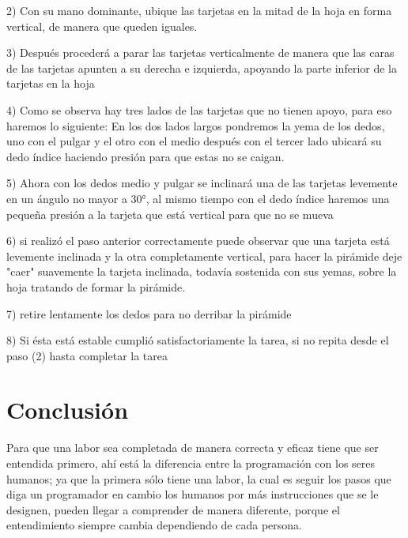 \documentclass{article}
\begin{document}
\vspace{10PT}

2) Con su mano dominante, ubique las tarjetas en la mitad de la hoja en forma vertical, de manera que queden iguales.

\vspace{10PT}

3) Después procederá a parar las tarjetas verticalmente de manera que las caras de las tarjetas apunten a su derecha e izquierda, apoyando la parte inferior de la tarjetas en la hoja 

\vspace{10PT}

4) Como se observa hay tres lados de las tarjetas que no tienen apoyo, para eso haremos lo siguiente: En los dos lados largos pondremos la yema de los dedos, uno con el pulgar y el otro con el medio después con el tercer lado ubicará su dedo índice haciendo presión para que estas no se caigan.
\vspace{10PT}

5) Ahora con los dedos medio y pulgar se inclinará una de las tarjetas levemente en un ángulo no mayor a 30°, al mismo tiempo con el dedo índice haremos una pequeña presión a la tarjeta que está vertical para que no se mueva

\vspace{10PT}

6) si realizó el paso anterior correctamente puede observar que una tarjeta está levemente inclinada y la otra completamente vertical, para hacer la pirámide deje "caer" suavemente la tarjeta inclinada, todavía sostenida con sus yemas, sobre la hoja tratando de formar la pirámide.

\vspace{10PT}

7) retire lentamente los dedos para no derribar la pirámide 

\vspace{10PT}

8) Si ésta está estable cumplió satisfactoriamente la tarea, si no repita desde el paso (2) hasta completar la tarea 


\section{Conclusión} \label{imagenes}

Para que una labor sea completada de manera correcta y eficaz tiene que ser entendida primero, ahí está la diferencia entre la programación con los seres humanos; ya que la primera sólo tiene una labor, la cual es seguir los pasos que diga un programador en cambio los humanos por más instrucciones que se le designen, pueden llegar a  comprender de  manera diferente, porque el entendimiento siempre cambia dependiendo de cada persona.
 
\end{document}
